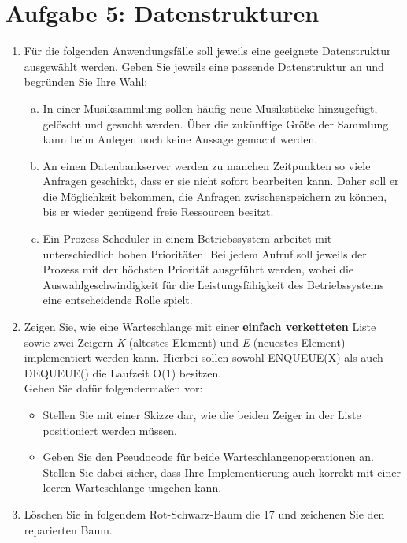 \documentclass{scrartcl}
\begin{document}
\section*{Aufgabe 5: Datenstrukturen}
\begin{enumerate}[(1)]
\item Für die folgenden Anwendungsfälle soll jeweils eine geeignete Datenstruktur ausgewählt werden. Geben Sie jeweils eine passende Datenstruktur an und begründen Sie Ihre Wahl:
\begin{enumerate}[(a)]
\item In einer Musiksammlung sollen häufig neue Musikstücke hinzugefügt, gelöscht und gesucht werden. Über die zukünftige Größe der Sammlung kann beim Anlegen noch keine Aussage gemacht werden.
\item An einen Datenbankserver werden zu manchen Zeitpunkten so viele Anfragen geschickt, dass er sie nicht sofort bearbeiten kann. Daher soll er die Möglichkeit bekommen, die Anfragen zwischenspeichern zu können, bis er wieder genügend freie Ressourcen besitzt.
\item Ein Prozess-Scheduler in einem Betriebssystem arbeitet mit unterschiedlich hohen Prioritäten. Bei jedem Aufruf soll jeweils der Prozess mit der höchsten Priorität ausgeführt werden, wobei die Auswahlgeschwindigkeit für die Leistungsfähigkeit des Betriebssystems eine entscheidende Rolle spielt.
\end{enumerate}

\item Zeigen Sie, wie eine Warteschlange mit einer \textbf{einfach verketteten} Liste sowie zwei Zeigern \textit{K} (ältestes Element) und \textit{E} (neuestes Element) implementiert werden kann. Hierbei sollen sowohl ENQUEUE(X) als auch DEQUEUE() die Laufzeit O(1) besitzen.\\
Gehen Sie dafür folgendermaßen vor:\\
\begin{itemize}
	\item Stellen Sie mit einer Skizze dar, wie die beiden Zeiger in der Liste positioniert werden müssen.
	\item Geben Sie den Pseudocode für beide Warteschlangenoperationen an. Stellen  Sie dabei sicher, dass Ihre Implementierung auch korrekt mit einer leeren Warteschlange umgehen kann.
\end{itemize}

\item Löschen Sie in folgendem Rot-Schwarz-Baum die 17 und zeichenen Sie den reparierten Baum.


\end{enumerate}
\end{document}
